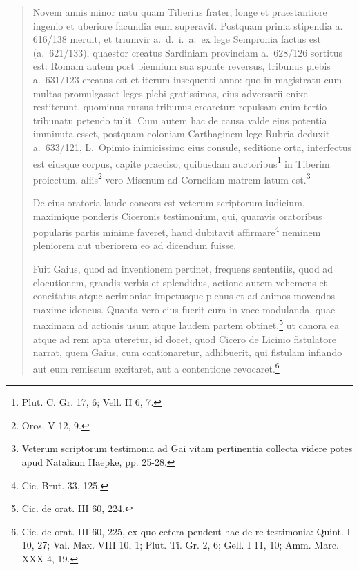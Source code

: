\begin{quotation}

\noindent Novem annis minor natu quam Tiberius frater, longe et praestantiore ingenio et uberiore facundia eum superavit. Postquam prima stipendia a. 616/138 meruit, et triumvir a.\ d.\ i.\ a.\ ex lege Sempronia factus est (a.~621/133), quaestor creatus Sardiniam provinciam a.~628/126 sortitus est: Romam autem post biennium sua sponte reversus, tribunus plebis a.~631/123 creatus est et iterum insequenti anno: quo in magistratu cum multas promulgasset leges plebi gratissimas, eius adversarii enixe restiterunt, quominus rursus tribunus crearetur: repulsam enim tertio tribunatu petendo tulit. Cum autem hac de causa valde eius potentia imminuta esset, postquam coloniam Carthaginem lege Rubria deduxit a.~633/121, L.~Opimio inimicissimo eius consule, seditione orta, interfectus est eiusque corpus, capite praeciso, quibusdam auctoribus\footnote{Plut. C. Gr. 17, 6; Vell. II 6, 7.} in Tiberim proiectum, aliis\footnote{Oros. V 12, 9.} vero Misenum ad Corneliam matrem latum est.\footnote{Veterum scriptorum testimonia ad Gai vitam pertinentia collecta videre potes apud Nataliam Haepke, pp. 25-28.}

De eius oratoria laude concors est veterum scriptorum iudicium, maximique ponderis Ciceronis testimonium, qui, quamvis oratoribus popularis partis minime faveret, haud dubitavit affirmare\footnote{Cic. Brut. 33, 125.} neminem pleniorem aut uberiorem eo ad dicendum fuisse.

Fuit Gaius, quod ad inventionem pertinet, frequens sententiis, quod ad elocutionem, grandis verbis et splendidus, actione autem vehemens et concitatus atque acrimoniae impetusque plenus et ad animos movendos maxime idoneus. Quanta vero eius fuerit cura in voce modulanda, quae maximam ad actionis usum atque laudem partem obtinet,\footnote{Cic. de orat. III 60, 224.} ut canora ea atque ad rem apta uteretur, id docet, quod Cicero de Licinio fistulatore narrat, quem Gaius, cum contionaretur, adhibuerit, qui fistulam inflando aut eum remissum excitaret, aut a contentione revocaret.\footnote{Cic. de orat. III 60, 225, ex quo cetera pendent hac de re testimonia: Quint. I 10, 27; Val. Max. VIII 10, 1; Plut. Ti. Gr. 2, 6; Gell. I 11, 10; Amm. Marc. XXX 4, 19.}


\end{quotation}
